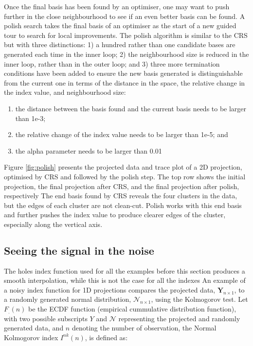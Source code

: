 Once the final basis has been found by an optimiser, one may want to
push further in the close neighbourhood to see if an even better basis
can be found. A polish search takes the final basis of an optimiser as
the start of a new guided tour to search for local improvements. The
polish algorithm is similar to the CRS but with three distinctions: 1) a
hundred rather than one candidate bases are generated each time in the
inner loop; 2) the neighbourhood size is reduced in the inner loop,
rather than in the outer loop; and 3) three more termination conditions
have been added to ensure the new basis generated is distinguishable
from the current one in terms of the distance in the space, the relative
change in the index value, and neighbourhood size:

\begin{enumerate}
\def\labelenumi{\arabic{enumi})}
\tightlist
\item
  the distance between the basis found and the current basis needs to be
  larger than 1e-3;
\item
  the relative change of the index value needs to be larger than 1e-5;
  and
\item
  the alpha parameter needs to be larger than 0.01
\end{enumerate}

Figure \ref{fig:polish} presents the projected data and trace plot of a
2D projection, optimised by CRS and followed by the polish step. The top
row shows the initial projection, the final projection after CRS, and
the final projection after polish, respectively The end basis found by
CRS reveals the four clusters in the data, but the edges of each cluster
are not clean-cut. Polish works with this end basis and further pushes
the index value to produce clearer edges of the cluster, especially
along the vertical axis.

\hypertarget{seeing-the-signal-in-the-noise}{%
\subsection{Seeing the signal in the
noise}\label{seeing-the-signal-in-the-noise}}

The holes index function used for all the examples before this section
produces a smooth interpolation, while this is not the case for all the
indexes An example of a noisy index function for 1D projections compares
the projected data, \(\mathbf{Y}_{n \times 1}\), to a randomly generated
normal distribution, \(\mathcal{N}_{n \times 1}\), using the Kolmogorov
test. Let \(F_{.}(n)\) be the ECDF function (empirical cummulative
distribution function), with two possible subscripts \(Y\) and
\(\mathcal{N}\) representing the projected and randomly generated data,
and \(n\) denoting the number of observation, the Normal Kolmogorov
index \(I^{nk}(n)\), is defined as:

